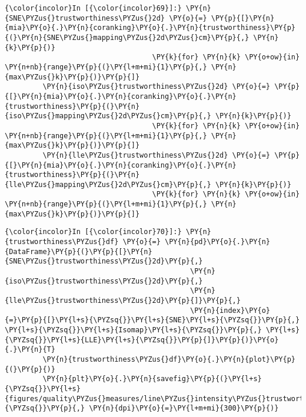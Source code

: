     \begin{Verbatim}[commandchars=\\\{\}]
{\color{incolor}In [{\color{incolor}69}]:} \PY{n}{SNE\PYZus{}trustworthiness\PYZus{}2d} \PY{o}{=} \PY{p}{[}\PY{n}{mia}\PY{o}{.}\PY{n}{coranking}\PY{o}{.}\PY{n}{trustworthiness}\PY{p}{(}\PY{n}{SNE\PYZus{}mapping\PYZus{}2d\PYZus{}cm}\PY{p}{,} \PY{n}{k}\PY{p}{)}
                                   \PY{k}{for} \PY{n}{k} \PY{o+ow}{in} \PY{n+nb}{range}\PY{p}{(}\PY{l+m+mi}{1}\PY{p}{,} \PY{n}{max\PYZus{}k}\PY{p}{)}\PY{p}{]}
         \PY{n}{iso\PYZus{}trustworthiness\PYZus{}2d} \PY{o}{=} \PY{p}{[}\PY{n}{mia}\PY{o}{.}\PY{n}{coranking}\PY{o}{.}\PY{n}{trustworthiness}\PY{p}{(}\PY{n}{iso\PYZus{}mapping\PYZus{}2d\PYZus{}cm}\PY{p}{,} \PY{n}{k}\PY{p}{)}
                                   \PY{k}{for} \PY{n}{k} \PY{o+ow}{in} \PY{n+nb}{range}\PY{p}{(}\PY{l+m+mi}{1}\PY{p}{,} \PY{n}{max\PYZus{}k}\PY{p}{)}\PY{p}{]}
         \PY{n}{lle\PYZus{}trustworthiness\PYZus{}2d} \PY{o}{=} \PY{p}{[}\PY{n}{mia}\PY{o}{.}\PY{n}{coranking}\PY{o}{.}\PY{n}{trustworthiness}\PY{p}{(}\PY{n}{lle\PYZus{}mapping\PYZus{}2d\PYZus{}cm}\PY{p}{,} \PY{n}{k}\PY{p}{)}
                                   \PY{k}{for} \PY{n}{k} \PY{o+ow}{in} \PY{n+nb}{range}\PY{p}{(}\PY{l+m+mi}{1}\PY{p}{,} \PY{n}{max\PYZus{}k}\PY{p}{)}\PY{p}{]}
\end{Verbatim}

    \begin{Verbatim}[commandchars=\\\{\}]
{\color{incolor}In [{\color{incolor}70}]:} \PY{n}{trustworthiness\PYZus{}df} \PY{o}{=} \PY{n}{pd}\PY{o}{.}\PY{n}{DataFrame}\PY{p}{(}\PY{p}{[}\PY{n}{SNE\PYZus{}trustworthiness\PYZus{}2d}\PY{p}{,}
                                            \PY{n}{iso\PYZus{}trustworthiness\PYZus{}2d}\PY{p}{,}
                                            \PY{n}{lle\PYZus{}trustworthiness\PYZus{}2d}\PY{p}{]}\PY{p}{,}
                                            \PY{n}{index}\PY{o}{=}\PY{p}{[}\PY{l+s}{\PYZsq{}}\PY{l+s}{SNE}\PY{l+s}{\PYZsq{}}\PY{p}{,} \PY{l+s}{\PYZsq{}}\PY{l+s}{Isomap}\PY{l+s}{\PYZsq{}}\PY{p}{,} \PY{l+s}{\PYZsq{}}\PY{l+s}{LLE}\PY{l+s}{\PYZsq{}}\PY{p}{]}\PY{p}{)}\PY{o}{.}\PY{n}{T}
         \PY{n}{trustworthiness\PYZus{}df}\PY{o}{.}\PY{n}{plot}\PY{p}{(}\PY{p}{)}
         \PY{n}{plt}\PY{o}{.}\PY{n}{savefig}\PY{p}{(}\PY{l+s}{\PYZsq{}}\PY{l+s}{figures/quality\PYZus{}measures/line\PYZus{}intensity\PYZus{}trustworthiness\PYZus{}2d.png}\PY{l+s}{\PYZsq{}}\PY{p}{,} \PY{n}{dpi}\PY{o}{=}\PY{l+m+mi}{300}\PY{p}{)}
\end{Verbatim}


